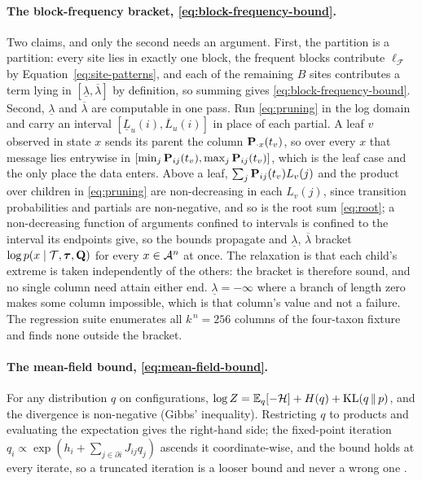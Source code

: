 \documentclass[11pt,a4paper]{article}
\begin{document}
\paragraph{The block-frequency bracket, \eqref{eq:block-frequency-bound}.}
Two claims, and only the second needs an argument. First, the partition is a
partition: every site lies in exactly one block, the frequent blocks
contribute $\ell_{\mathcal{F}}$ by Equation~\ref{eq:site-patterns}, and each
of the remaining $B$ sites contributes a term lying in
$[\underline\lambda, \overline\lambda]$ by definition, so summing gives
\eqref{eq:block-frequency-bound}. Second, $\underline\lambda$ and
$\overline\lambda$ are computable in one pass. Run \eqref{eq:pruning} in the
log domain and carry an interval $[\underline{L}_u(i), \overline{L}_u(i)]$ in
place of each partial. A leaf $v$ observed in state $x$ sends its parent the
column $\mathbf{P}_{\cdot x}(t_v)$, so over every $x$ that message lies entrywise
in $[\min_j \mathbf{P}_{ij}(t_v), \max_j \mathbf{P}_{ij}(t_v)]$, which is the leaf case
and the only place the data enters. Above a leaf, $\sum_j \mathbf{P}_{ij}(t_v)
L_v(j)$ and the product over children in \eqref{eq:pruning} are non-decreasing
in each $L_v(j)$, since transition probabilities and partials are
non-negative, and so is the root sum \eqref{eq:root}; a non-decreasing
function of arguments confined to intervals is confined to the interval its
endpoints give, so the bounds propagate and $\underline\lambda$,
$\overline\lambda$ bracket $\log p(x \mid \mathcal{T}, \boldsymbol{\tau}, \mathbf{Q})$ for every
$x \in \mathcal{A}^n$ at once. The relaxation is that each child's extreme is
taken independently of the others: the bracket is therefore sound, and no
single column need attain either end. $\underline\lambda = -\infty$ where a
branch of length zero makes some column impossible, which is that column's
value and not a failure. The regression suite enumerates all $k^{\,n} = 256$
columns of the four-taxon fixture and finds none outside the bracket.

\paragraph{The mean-field bound, \eqref{eq:mean-field-bound}.}
For any distribution $q$ on configurations,
$\log Z = \mathbb{E}_q[-\mathcal{H}] + H(q) + \mathrm{KL}(q \,\|\, p)$, and the
divergence is non-negative (Gibbs' inequality). Restricting $q$ to products
and evaluating the expectation gives the right-hand side; the fixed-point
iteration $q_i \propto \exp(h_i + \sum_{j \in \partial i} J_{ij} q_j)$
ascends it coordinate-wise, and the bound holds at every iterate, so a
truncated iteration is a looser bound and never a wrong one
\citep{mackay2003, mezard2009}.
\end{document}
